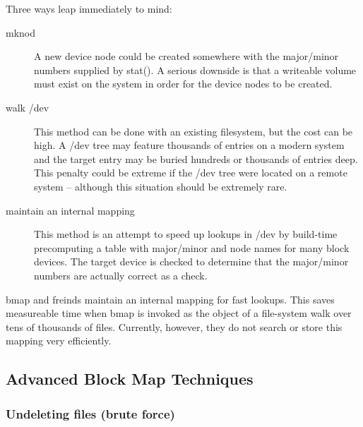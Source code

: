 \documentclass[letterpaper]{article}
\begin{document}
Three ways leap immediately to mind:
\begin{description}
\item[{\ttfamily mknod}] \mbox{}

A new device node could be created somewhere with the
major/minor numbers supplied by {\ttfamily stat()}. A
serious downside is that a writeable volume must
exist on the system in order for the device nodes to
be created.



\item[walk /dev] \mbox{}

This method can be done with an existing filesystem, but
the cost can be high. A /dev tree may feature thousands
of entries on a modern system and the target entry may
be buried hundreds or thousands of entries deep. This
penalty could be extreme if the /dev tree were located
on a remote system -- although this situation should be
extremely rare.



\item[maintain an internal mapping] \mbox{}

This method is an attempt to speed up lookups in /dev
by build-time precomputing a table with major/minor and
node names for many block devices. The target device
is checked to determine that the major/minor numbers
are actually correct as a check.

\end{description}


{\ttfamily bmap} and freinds maintain an internal mapping for fast lookups.
This saves measureable time when bmap is invoked as the object of a file-system
walk over tens of thousands of files. Currently, however, they do not
search or store this mapping very efficiently.




\subsection{Advanced Block Map Techniques}






\subsubsection{Undeleting files (brute force)}
\end{document}
